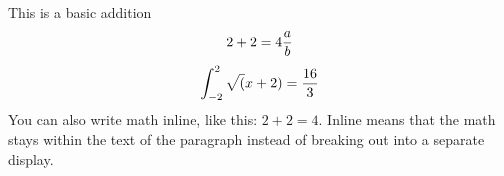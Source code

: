 



This is a basic addition
$$
2 + 2 = 4 
{{a} \over {b}}
$$
$$
\int_{-2}^2 \sqrt(x+2) ={{16} \over {3}}
$$
You can also write math inline, like this: $2 + 2 = 4$. Inline means that the
math stays within the text of the paragraph instead of breaking out into a
separate display.

\bye
